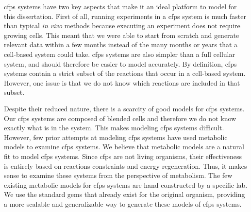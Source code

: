 \gls{cfps} systems have two key aspects that make it an ideal platform to model for this dissertation.
First of all, running experiments in a \gls{cfps} system is much faster than typical \textit{in vivo} methods because executing an experiment does not require growing cells.
This meant that we were able to start from scratch and generate relevant data within a few months instead of the many months or years that a cell-based system could take.
\gls{cfps} systems are also simpler than a full cellular system, and should therefore be easier to model accurately.
By definition, \gls{cfps} systems contain a strict subset of the reactions that occur in a cell-based system.
However, one issue is that we do not know which reactions are included in that subset.

Despite their reduced nature, there is a scarcity of good models for \gls{cfps} systems.
Our \gls{cfps} systems are composed of blended cells and therefore we do not know exactly what is in the system.
This makes modeling \gls{cfps} systems difficult.
However, few prior attempts at modeling \gls{cfps} systems have used metabolic models to examine \gls{cfps} systems.
We believe that metabolic models are a natural fit to model \gls{cfps} systems.
Since \gls{cfps} are not living organisms, their effectiveness is entirely based on reactions constraints and energy regeneration.
Thus, it makes sense to examine these systems from the perspective of metabolism.
The few existing metabolic models for \gls{cfps} systems are hand-constructed by a specific lab.
We use the standard \glspl{gem} that already exist for the original organism, providing a more scalable and generalizable way to generate these models of \gls{cfps} systems.

